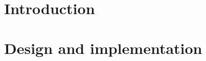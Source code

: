 \documentclass[superscriptaddress, a4paper]{article}
\begin{document}
\section{Introduction}
\label{sec:introduction}



\section{Design and implementation}
\label{sec:design and implementation}
\end{document}
